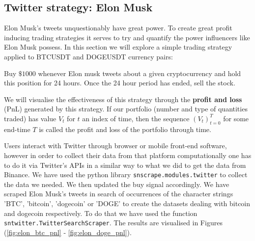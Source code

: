 \documentclass[twoside]{report}
\newcommand{\code}{\texttt}
\begin{document}
\begin{spacing}{1}
\subsection{Twitter strategy: Elon Musk}
Elon Musk's tweets unquestionably have great power. To create great profit inducing trading strategies it serves to try and quantify the power influencers like Elon Musk possess. In this section we will explore a simple trading strategy applied to BTCUSDT and DOGEUSDT currency pairs: \begin{strategy}
Buy $\$1000$ whenever Elon musk tweets about a given cryptocurrency and hold this position for 24 hours. Once the 24 hour period has ended, sell the stock.
\end{strategy}\label{strat:musk} 
We will visualise the effectiveness of this strategy through the \textbf{profit and loss} (PnL) generated by this strategy. If our portfolio (number and type of quantities traded) has value $V_t$ for $t$ an index of time, then the sequence $(V_t)_{t=0}^T$ for some end-time $T$ is called the profit and loss of the portfolio through time.

Users interact with Twitter through browser or mobile front-end software, however in order to collect their data from that platform computationally one has to do it via Twitter's APIs in a similar way to what we did to get the data from Binance.
We have used the python library \code{snscrape.modules.twitter} to collect the data we needed. We then updated the buy signal accordingly. We have scraped Elon Musk's tweets in search of occurrences of the character strings 'BTC', 'bitcoin', 'dogecoin' or 'DOGE' to create the datasets dealing with bitcoin and dogecoin respectively. To do that we have used the function \code{sntwitter.TwitterSearchScraper}. The results are visualised in Figures (\ref{fig:elon_btc_pnl} - \ref{fig:elon_doge_pnl}).


\end{spacing}
\end{document}
